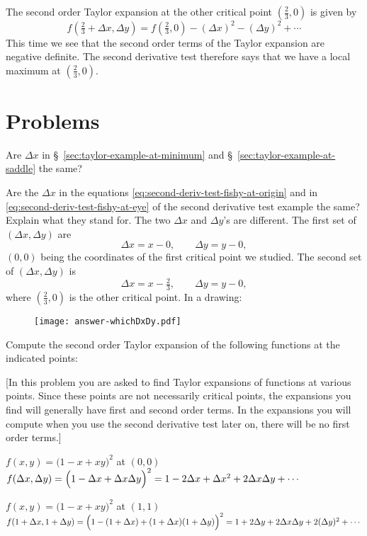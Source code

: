 The second order Taylor expansion at the other critical point $(\frac 23, 0)$ is given by
\begin{equation}
f(\tfrac23 + \Delta x, \Delta y)
= f(\tfrac23, 0) - (\Delta x)^2 - (\Delta y)^2 + \cdots
\label{eq:second-deriv-test-fishy-at-eye}
\end{equation}
This time we see that the second order terms of the Taylor expansion are negative definite. The second derivative test therefore says that we have a local maximum at $(\frac 23, 0)$.




\section{Problems}  
\begin{multicols}{2}
\problemfont
{} Are $\Delta x$ in \S~\ref{sec:taylor-example-at-minimum}
and \S~\ref{sec:taylor-example-at-saddle} the same?

Are the $\Delta x$ in the equations \eqref{eq:second-deriv-test-fishy-at-origin} and
in \eqref{eq:second-deriv-test-fishy-at-eye} of the second derivative test example
the same?  Explain what they stand for.
\answer
The two $\Delta x$ and $\Delta y$'s are different.  The first set of $(\Delta
x,\Delta y)$ are 
\[
  \Delta x = x-0, \qquad \Delta y = y-0,
\]
$(0,0)$ being the coordinates of the first critical point we studied.  The second set
of $(\Delta x,\Delta y)$ is
\[
  \Delta x = x-\tfrac23, \qquad \Delta y = y-0,
\]
where $(\frac23, 0)$ is the other critical point.  In a drawing:
\begin{figure}[h]
\texttt{[image: answer-whichDxDy.pdf]}
\end{figure}
\endanswer

\problem
Compute the second order Taylor expansion of the following functions
at the indicated points:

[In this problem you are asked to find Taylor expansions of functions
at various points.  Since these points are not necessarily critical points, the
expansions you find will generally have first and second order terms.
In the expansions you will compute when you use the second derivative
test later on, there will be no first order terms.]

\subprob $f(x, y) =\bigl(1-x+xy\bigr)^2$ at $(0,0)$
\answer 
$f(\Delta x, \Delta y)
= \Bigl(1-\Delta x+\Delta x\Delta y\Bigr)^2
= 1-2\Delta x+\Delta x^2+2\Delta x\Delta
y+\cdots$
\endanswer

\subprob  $f(x, y) =\bigl(1-x+xy\bigr)^2$ at $(1,1)$ 
\answer
$f(1+\Delta x, 1+\Delta y)
= \Bigl(1-(1+\Delta x)+(1+\Delta x)(1+\Delta y)\Bigr)^2
=
1+2\Delta y+2\Delta x\Delta y+2(\Delta y)^2+\cdots$
\endanswer


\end{multicols}
